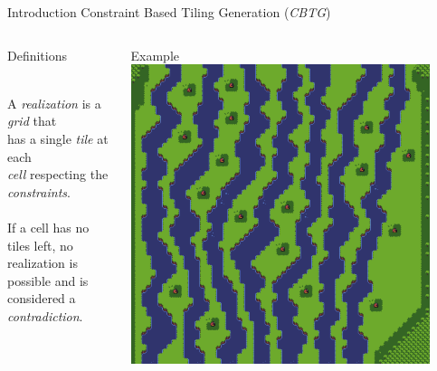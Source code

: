 \documentclass{beamer}
\begin{document}
  \begin{frame}[fragile]{Introduction}
    Constraint Based Tiling Generation (\textit{CBTG})
    \begin{columns}[T,onlytextwidth]
        \begin{block}{Definitions}

          \hfill \\
          A \textit{realization} is a \textit{grid} that \\
          has a single \textit{tile} at each \\
          \textit{cell} respecting the \textit{constraints}.
          \hfill \\
          \hfill \\
          If a cell has no tiles left, no \\
          realization is possible and is
          considered a \textit{contradiction}.
        \end{block}
        \begin{block}{Example}
          \includegraphics[width=0.9\textwidth]{img/forestmicro_64x64.pdf}
        \end{block}
    \end{columns}
  \end{frame}
\end{document}
